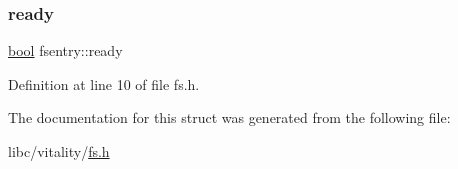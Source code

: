 \mbox{\label{a00260_a284522ed97fe1eeebd0fcc039b2ea00a_a284522ed97fe1eeebd0fcc039b2ea00a}} 
\subsubsection{\texorpdfstring{ready}{ready}}
{\footnotesize\ttfamily \hyperlink{a00134_af6a258d8f3ee5206d682d799316314b1_af6a258d8f3ee5206d682d799316314b1}{bool} fsentry\+::ready}



Definition at line 10 of file fs.\+h.



The documentation for this struct was generated from the following file\+:\begin{DoxyCompactItemize}
\item 
libc/vitality/\hyperlink{a00146}{fs.\+h}\end{DoxyCompactItemize}

